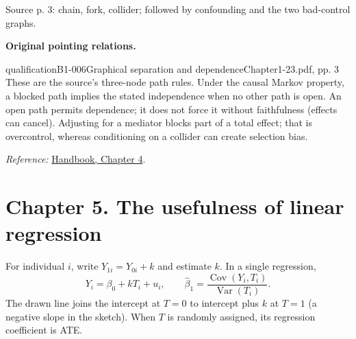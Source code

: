 {\begin{center}
\par{\small Source p. 3: chain, fork, collider; followed by confounding and the two bad-control graphs.}
\end{center}
\par{}\smallskip\textbf{Original pointing relations.}\par\smallskip
{}
\begin{reviewnote}{qualification}{B1-006}{Graphical separation and dependence}{Chapter1-23.pdf, pp. 3}
These are the source's three-node path rules. Under the causal Markov property, a blocked path implies the stated independence when no other path is open. An open path permits dependence; it does not force it without faithfulness (effects can cancel). Adjusting for a mediator blocks part of a total effect; that is overcontrol, whereas conditioning on a collider can create selection bias.
\par\smallskip\textit{Reference:} \href{https://matheusfacure.github.io/python-causality-handbook/04-Graphical-Causal-Models.html}{Handbook, Chapter 4}.
\end{reviewnote}
\section{Chapter 5. The usefulness of linear regression}
For individual $i$, write $Y_{1i}=Y_{0i}+k$ and estimate $k$. In a single regression,
\[Y_i=\beta_0+kT_i+u_i,\qquad \hat\beta_1=\frac{\operatorname{Cov}(Y_i,T_i)}{\operatorname{Var}(T_i)}.\]
The drawn line joins the intercept at $T=0$ to intercept plus $k$ at $T=1$ (a negative slope in the sketch). When $T$ is randomly assigned, its regression coefficient is ATE.

}
